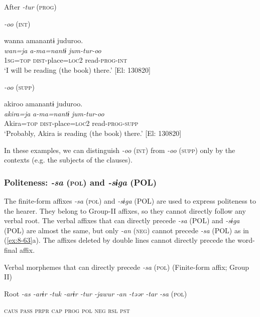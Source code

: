 \ea\label{ex:8-62}
  After \textit{-tur} (\textsc{prog})

\ea \textit{-oo} (\textsc{int})

{\TM}
\glll  wanna  amanantɨ  juduroo.\\
\textit{wan=ja}  \textit{a-ma=nantɨ}  \textit{jum-tur-oo}\\
1\textsc{sg}=\textsc{top}  \textsc{dist}-place=\textsc{loc}2  read-\textsc{prog}-\textsc{int}\\
\glt ‘I will be reading (the book) there.’ [El: 130820]


\ex \textit{-oo} (\textsc{supp})

{\TM}
\glll  akiroo  amanantɨ  juduroo.\\
\textit{akira=ja}  \textit{a-ma=nantɨ}  \textit{jum-tur-oo}\\
Akira=\textsc{top}  \textsc{dist}-place=\textsc{loc}2  read-\textsc{prog}-\textsc{supp}\\
\glt ‘Probably, Akira is reading (the book) there.’ [El: 130820]
\z
\z

In these examples, we can distinguish \textit{-oo} (\textsc{int}) from \textit{-oo} (\textsc{supp}) only by the contexts (e.g. the subjects of the clauses).

\subsubsection{Politeness: \textit{-sa} (\textsc{pol}) and \textit{-sɨga} (POL)}

The finite-form affixes \textit{-sa} (\textsc{pol}) and \textit{-sɨga} (POL) are used to express politeness to the hearer. They belong to Group-II affixes, so they cannot directly follow any verbal root. The verbal affixes that can directly precede \textit{-sa} (POL) and \textit{-sɨga} (POL) are almost the same, but only \textit{-an} (\textsc{neg}) cannot precede \textit{-sa} (POL) as in (\ref{ex:8-63}a). The affixes deleted by double lines cannot directly precede the word-final affix.

\ea\label{ex:8-63}
\ea Verbal morphemes that can directly precede \textit{-sa} (\textsc{pol}) (Finite-form affix; Group II)

  Root  \textit{-as  -arɨr} %
\textit{-tuk  -arɨr  -tur  -jawur} %
\textit{-an  -təər  -tar  -sa} (\textsc{pol})

    \textsc{caus}  \textsc{pass}  \textsc{prpr}  \textsc{cap}  \textsc{prog}  \textsc{pol}  \textsc{neg}  \textsc{rsl}  \textsc{pst}

